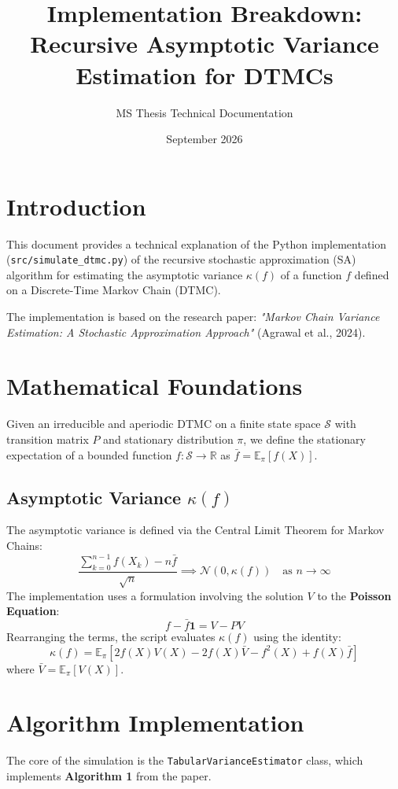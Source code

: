 \documentclass[11pt,a4paper]{article}
\title{Implementation Breakdown: Recursive Asymptotic Variance Estimation for DTMCs}
\author{MS Thesis Technical Documentation}
\date{September 2026}
\begin{document}
\maketitle

\section{Introduction}
This document provides a technical explanation of the Python implementation (\texttt{src/simulate\_dtmc.py}) of the recursive stochastic approximation (SA) algorithm for estimating the asymptotic variance $\kappa(f)$ of a function $f$ defined on a Discrete-Time Markov Chain (DTMC). 

The implementation is based on the research paper: \textit{"Markov Chain Variance Estimation: A Stochastic Approximation Approach"} (Agrawal et al., 2024).

\section{Mathematical Foundations}
Given an irreducible and aperiodic DTMC on a finite state space $\mathcal{S}$ with transition matrix $P$ and stationary distribution $\pi$, we define the stationary expectation of a bounded function $f: \mathcal{S} \to \mathbb{R}$ as $\bar{f} = \mathbb{E}_\pi[f(X)]$.

\subsection{Asymptotic Variance $\kappa(f)$}
The asymptotic variance is defined via the Central Limit Theorem for Markov Chains:
\begin{equation}
    \frac{\sum_{k=0}^{n-1} f(X_k) - n\bar{f}}{\sqrt{n}} \implies \mathcal{N}(0, \kappa(f)) \quad \text{as } n \to \infty
\end{equation}
The implementation uses a formulation involving the solution $V$ to the \textbf{Poisson Equation}:
\begin{equation}
    f - \bar{f}\mathbf{1} = V - PV
\end{equation}
Rearranging the terms, the script evaluates $\kappa(f)$ using the identity:
\begin{equation}
    \kappa(f) = \mathbb{E}_\pi[2f(X)V(X) - 2f(X)\bar{V} - f^2(X) + f(X)\bar{f}]
\end{equation}
where $\bar{V} = \mathbb{E}_\pi[V(X)]$.

\section{Algorithm Implementation}
The core of the simulation is the \texttt{TabularVarianceEstimator} class, which implements \textbf{Algorithm 1} from the paper.
\end{document}
